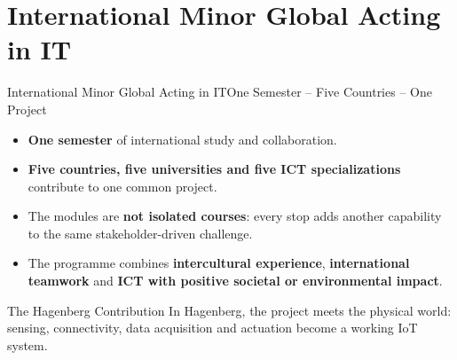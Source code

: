 \part[nopartpage]{International Minor Global Acting in IT}

\begin{frame}{International Minor Global Acting in IT}{One Semester -- Five Countries -- One Project}
\begin{itemize}
    \item \textbf{One semester} of international study and collaboration.
    \item \textbf{Five countries, five universities and five ICT specializations} contribute to one common project.
    \item The modules are \textbf{not isolated courses}: every stop adds another capability to the same stakeholder-driven challenge.
    \item The programme combines \textbf{intercultural experience}, \textbf{international teamwork} and \textbf{ICT with positive societal or environmental impact}.
\end{itemize}
\begin{block}{The Hagenberg Contribution}
In Hagenberg, the project meets the physical world: sensing, connectivity, data acquisition and actuation become a working IoT system.
\end{block}
\end{frame}

